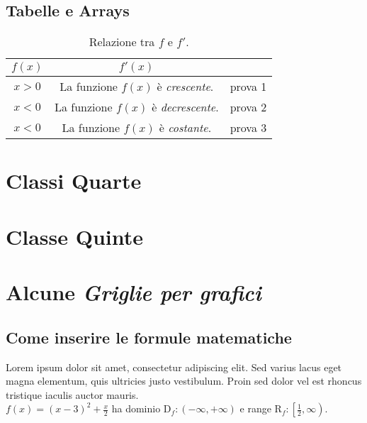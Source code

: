 \documentclass[11pt]{article}
\begin{document}
	\subsection{Tabelle e Arrays}
	\begin{table}[H]
	\caption{Relazione tra $f$ e $f'$.}
	\def\arraystretch{1.5}
	\begin{tabular}{c|c|r} %

	{$f(x)$} & {$f'(x)$}\\ \hline
	$x>0$ & La funzione $f(x)$ è \emph{crescente}. & prova 1\\
	\hline
	$x<0$ & La funzione $f(x)$ è \emph{decrescente}. & prova 2\\
	\hline	
	$x<0$ & La funzione $f(x)$ è \emph{costante}. & prova 3\\	
	\end{tabular}
		
	\end{table}

\section{Classi Quarte}
\section{Classe Quinte}

\section{Alcune \emph {Griglie per grafici}}
\subsection{Come inserire le formule matematiche}
Lorem ipsum dolor sit amet, consectetur adipiscing elit. Sed varius lacus eget magna elementum, quis ultricies justo vestibulum. Proin sed dolor vel est rhoncus tristique iaculis auctor mauris.\\[3mm]
$f(x)=(x-3)^2+ \displaystyle \frac{x}{2}$ ha dominio $\mathrm{D}_f:(-\infty,+\infty)$
e range $\mathrm{R}_f:\left[\frac{1}{2},\infty\right)$.\\
\end{document}
